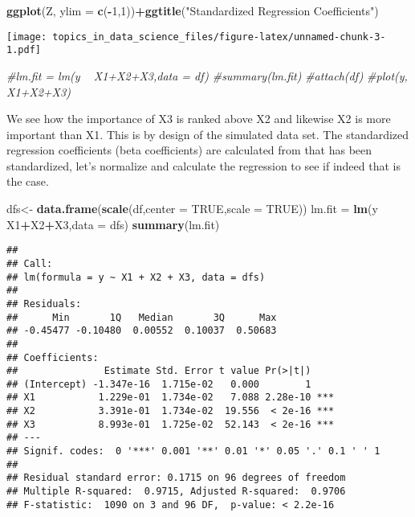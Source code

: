 \documentclass[
  11pt,
]{book}
\newenvironment{Shaded}{\begin{snugshade}}{\end{snugshade}}
\newcommand{\CommentTok}[1]{\textcolor[rgb]{0.56,0.35,0.01}{\textit{#1}}}
\newcommand{\DataTypeTok}[1]{\textcolor[rgb]{0.13,0.29,0.53}{#1}}
\newcommand{\DecValTok}[1]{\textcolor[rgb]{0.00,0.00,0.81}{#1}}
\newcommand{\KeywordTok}[1]{\textcolor[rgb]{0.13,0.29,0.53}{\textbf{#1}}}
\newcommand{\NormalTok}[1]{#1}
\newcommand{\OperatorTok}[1]{\textcolor[rgb]{0.81,0.36,0.00}{\textbf{#1}}}
\newcommand{\OtherTok}[1]{\textcolor[rgb]{0.56,0.35,0.01}{#1}}
\newcommand{\StringTok}[1]{\textcolor[rgb]{0.31,0.60,0.02}{#1}}
\begin{document}
\begin{Shaded}
\begin{Highlighting}[]
\KeywordTok{ggplot}\NormalTok{(Z, }\DataTypeTok{ylim =} \KeywordTok{c}\NormalTok{(}\OperatorTok{-}\DecValTok{1}\NormalTok{,}\DecValTok{1}\NormalTok{))}\OperatorTok{+}\KeywordTok{ggtitle}\NormalTok{(}\StringTok{"Standardized Regression Coefficients"}\NormalTok{)}
\end{Highlighting}
\end{Shaded}

\texttt{[image: topics\_in\_data\_science\_files/figure-latex/unnamed-chunk-3-1.pdf]}

\begin{Shaded}
\begin{Highlighting}[]
\CommentTok{#lm.fit = lm(y ~ X1+X2+X3,data = df)}
\CommentTok{#summary(lm.fit)}
\CommentTok{#attach(df)}
\CommentTok{#plot(y, X1+X2+X3)}
\end{Highlighting}
\end{Shaded}

We see how the importance of X3 is ranked above X2 and likewise X2 is more important than X1. This is by design of the simulated data set. The standardized regression coefficients (beta coefficients) are calculated from that has been standardized, let's normalize and calculate the regression to see if indeed that is the case.

\begin{Shaded}
\begin{Highlighting}[]
\NormalTok{dfs<-}\StringTok{ }\KeywordTok{data.frame}\NormalTok{(}\KeywordTok{scale}\NormalTok{(df,}\DataTypeTok{center =} \OtherTok{TRUE}\NormalTok{,}\DataTypeTok{scale =} \OtherTok{TRUE}\NormalTok{))}
\NormalTok{lm.fit =}\StringTok{ }\KeywordTok{lm}\NormalTok{(y }\OperatorTok{~}\StringTok{ }\NormalTok{X1}\OperatorTok{+}\NormalTok{X2}\OperatorTok{+}\NormalTok{X3,}\DataTypeTok{data =}\NormalTok{ dfs)}
\KeywordTok{summary}\NormalTok{(lm.fit)}
\end{Highlighting}
\end{Shaded}

\begin{verbatim}
## 
## Call:
## lm(formula = y ~ X1 + X2 + X3, data = dfs)
## 
## Residuals:
##      Min       1Q   Median       3Q      Max 
## -0.45477 -0.10480  0.00552  0.10037  0.50683 
## 
## Coefficients:
##               Estimate Std. Error t value Pr(>|t|)    
## (Intercept) -1.347e-16  1.715e-02   0.000        1    
## X1           1.229e-01  1.734e-02   7.088 2.28e-10 ***
## X2           3.391e-01  1.734e-02  19.556  < 2e-16 ***
## X3           8.993e-01  1.725e-02  52.143  < 2e-16 ***
## ---
## Signif. codes:  0 '***' 0.001 '**' 0.01 '*' 0.05 '.' 0.1 ' ' 1
## 
## Residual standard error: 0.1715 on 96 degrees of freedom
## Multiple R-squared:  0.9715, Adjusted R-squared:  0.9706 
## F-statistic:  1090 on 3 and 96 DF,  p-value: < 2.2e-16
\end{verbatim}
\end{document}
